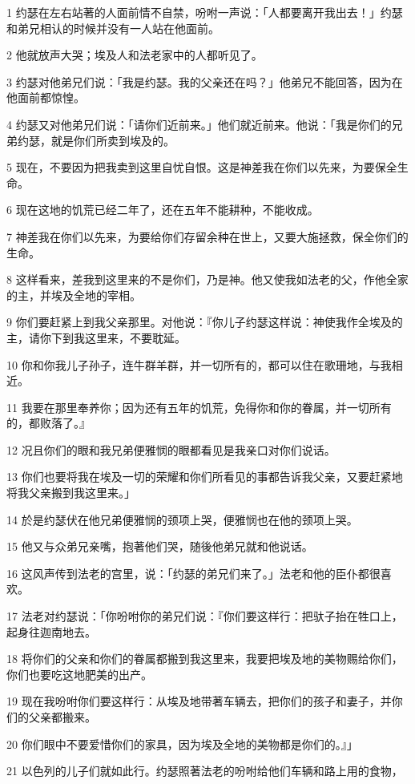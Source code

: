 \par 1 约瑟在左右站著的人面前情不自禁，吩咐一声说：「人都要离开我出去！」约瑟和弟兄相认的时候并没有一人站在他面前。
\par 2 他就放声大哭；埃及人和法老家中的人都听见了。
\par 3 约瑟对他弟兄们说：「我是约瑟。我的父亲还在吗？」他弟兄不能回答，因为在他面前都惊惶。
\par 4 约瑟又对他弟兄们说：「请你们近前来。」他们就近前来。他说：「我是你们的兄弟约瑟，就是你们所卖到埃及的。
\par 5 现在，不要因为把我卖到这里自忧自恨。这是神差我在你们以先来，为要保全生命。
\par 6 现在这地的饥荒已经二年了，还在五年不能耕种，不能收成。
\par 7 神差我在你们以先来，为要给你们存留余种在世上，又要大施拯救，保全你们的生命。
\par 8 这样看来，差我到这里来的不是你们，乃是神。他又使我如法老的父，作他全家的主，并埃及全地的宰相。
\par 9 你们要赶紧上到我父亲那里。对他说：『你儿子约瑟这样说：神使我作全埃及的主，请你下到我这里来，不要耽延。
\par 10 你和你我儿子孙子，连牛群羊群，并一切所有的，都可以住在歌珊地，与我相近。
\par 11 我要在那里奉养你；因为还有五年的饥荒，免得你和你的眷属，并一切所有的，都败落了。』
\par 12 况且你们的眼和我兄弟便雅悯的眼都看见是我亲口对你们说话。
\par 13 你们也要将我在埃及一切的荣耀和你们所看见的事都告诉我父亲，又要赶紧地将我父亲搬到我这里来。」
\par 14 於是约瑟伏在他兄弟便雅悯的颈项上哭，便雅悯也在他的颈项上哭。
\par 15 他又与众弟兄亲嘴，抱著他们哭，随後他弟兄就和他说话。
\par 16 这风声传到法老的宫里，说：「约瑟的弟兄们来了。」法老和他的臣仆都很喜欢。
\par 17 法老对约瑟说：「你吩咐你的弟兄们说：『你们要这样行：把驮子抬在牲口上，起身往迦南地去。
\par 18 将你们的父亲和你们的眷属都搬到我这里来，我要把埃及地的美物赐给你们，你们也要吃这地肥美的出产。
\par 19 现在我吩咐你们要这样行：从埃及地带著车辆去，把你们的孩子和妻子，并你们的父亲都搬来。
\par 20 你们眼中不要爱惜你们的家具，因为埃及全地的美物都是你们的。』」
\par 21 以色列的儿子们就如此行。约瑟照著法老的吩咐给他们车辆和路上用的食物，
